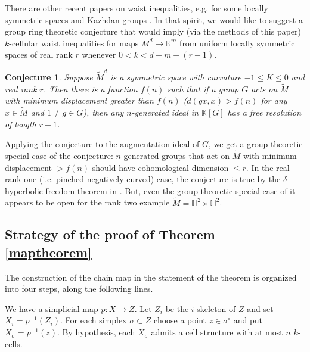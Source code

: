 \documentclass[11pt,letterpaper]{amsart}
\newtheorem{conjecture}[theorem]{Conjecture}
\begin{document}

There are other recent papers on waist inequalities, e.g. for some locally symmetric spaces \cite{fraczyklowewaist} and Kazhdan groups \cite{badersauerwaist}. In that spirit, we would like to suggest a group ring theoretic conjecture that would imply (via the methods of this paper) $k$-cellular waist inequalities for maps $M^d\rightarrow\mathbb R^m$ from uniform locally symmetric spaces of real rank $r$ whenever $0<k<d-m-(r-1)$. 
\begin{conjecture}
\label{higherrankconjecture}
Suppose $\widetilde M^d$ is a symmetric space with curvature $-1\leq K\leq 0$ and real rank $r$. Then there is a function $f(n)$ such that if a group $G$ acts on $\widetilde M$ with minimum displacement greater than $f(n)$ ($d(gx,x)> f(n)$ for any $x\in\widetilde M$ and $1\not=g\in G$), then any $n$-generated ideal in $\mathbb K[G]$ has a free resolution of length $r-1$.%
\end{conjecture}
Applying the conjecture to the augmentation ideal of $G$, we get a group theoretic special case of the conjecture: $n$-generated groups that act on $\widetilde M$ with minimum displacement $>f(n)$ should have cohomological dimension $\leq r$. In the real rank one (i.e. pinched negatively curved) case, the conjecture is true by the $\delta$-hyperbolic freedom theorem in \cite{avramididelzanthyperbolic}. But, even the group theoretic special case of it appears to be open for the rank two example $\widetilde M=\mathbb H^2\times\mathbb H^2$.

\subsection*{Strategy of the proof of Theorem \ref{maptheorem}}
The construction of the chain map in the statement of the theorem is organized into four steps, along the following lines. 

We have a simplicial map $p:X\rightarrow Z$. Let $Z_i$ be the $i$-skeleton of $Z$ and set $X_i=p^{-1}(Z_i)$. For each simplex $\sigma \subset Z$ choose a point $z\in\sigma^{\circ}$ and put $X_{\sigma}=p^{-1}(z)$. By hypothesis, each $X_{\sigma}$ admits a cell structure with at most $n$ $k$-cells.%
\end{document}
